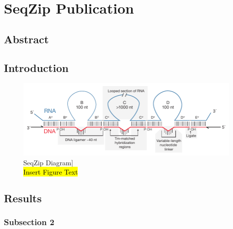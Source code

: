 \chapter{SeqZip Publication} 
\label{Chapter3} 
\section{Abstract}\label{c1sec: Abstract}

\section{Introduction}\label{c1sec: Introduction}

\begin{figure}[htbp]
	\centering 
	\includegraphics{Figures/Chapter3/Roy2014Fig1.pdf}
	\caption[SeqZip Diagram]
	{
		SeqZip Diagram]\\
		\hl{Insert Figure Text}
	}
	\label{fig:Roy2014 SeqZip Diagram}
\end{figure}


\section{Results}\label{c1sec: Results}

\subsection{Subsection 2}

